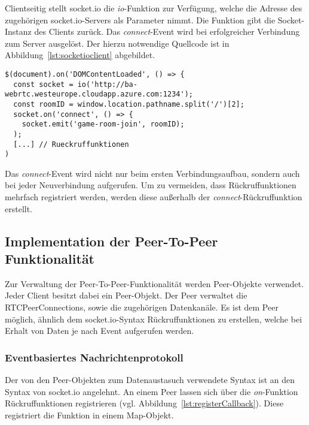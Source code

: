 \vspace{11pt}
Clientseitig stellt socket.io die \textit{io}-Funktion zur Verfügung, welche die Adresse des zugehörigen socket.io-Servers als Parameter nimmt. Die Funktion gibt die Socket-Instanz des Clients zurück. Das \textit{connect}-Event wird bei erfolgreicher Verbindung zum Server ausgelöst. Der hierzu notwendige Quellcode ist in Abbildung~\ref{lst:socketioclient} abgebildet.

\vspace{5pt}
\lstset{language=js, style=STYLE_CODE_JS}
\begin{minipage}{\textwidth}
\begin{singlespace}
\begin{lstlisting}[caption={Clientseitiger Verbindungsaufbau -- game.js}, captionpos=b, label={lst:socketioclient}]
$(document).on('DOMContentLoaded', () => {
  const socket = io('http://ba-webrtc.westeurope.cloudapp.azure.com:1234');
  const roomID = window.location.pathname.split('/')[2];
  socket.on('connect', () => {
    socket.emit('game-room-join', roomID);
  );
  [...] // Rueckruffunktionen
)
\end{lstlisting}
\end{singlespace}
\end{minipage}

Das \textit{connect}-Event wird nicht nur beim ersten Verbindungsaufbau, sondern auch bei jeder Neuverbindung aufgerufen. Um zu vermeiden, dass Rückruffunktionen mehrfach registriert werden, werden diese außerhalb der \textit{connect}-Rückruffunktion erstellt. 

\subsection{Implementation der Peer-To-Peer Funktionalität}
Zur Verwaltung der Peer-To-Peer-Funktionalität werden \glqq{}Peer\grqq{}-Objekte verwendet. Jeder Client besitzt dabei ein Peer-Objekt. Der Peer verwaltet die RTCPeerConnections, sowie die zugehörigen Datenkanäle. Es ist dem Peer möglich, ähnlich dem socket.io-Syntax Rückruffunktionen zu erstellen, welche bei Erhalt von Daten je nach Event aufgerufen werden.\par

\subsubsection{Eventbasiertes Nachrichtenprotokoll}
Der von den Peer-Objekten zum Datenaustasuch verwendete Syntax ist an den Syntax von socket.io angelehnt. An einem Peer lassen sich über die \textit{on}-Funktion Rückruffunktionen registrieren (vgl. Abbildung~\ref{lst:registerCallback}). Diese registriert die Funktion in einem Map-Objekt.\par


